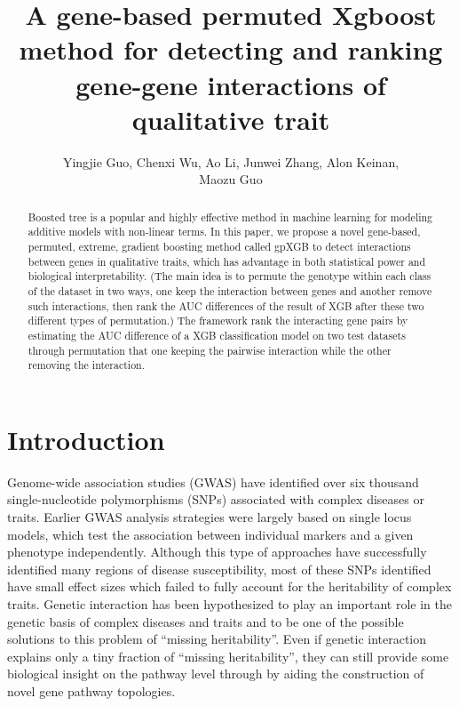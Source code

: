 \documentclass[11pt]{article}
\author{Yingjie Guo, Chenxi Wu, Ao Li, Junwei Zhang, Alon Keinan,\\ Maozu Guo}
\title{A gene-based permuted Xgboost method for detecting and ranking gene-gene interactions of qualitative trait}
\theoremstyle{plain}
\theoremstyle{definition}
\theoremstyle{remark}
\begin{document}
 
\maketitle
\begin{abstract}
Boosted tree is a popular and highly effective method in machine learning for modeling additive models with non-linear terms. In this paper, we propose a novel gene-based, permuted, extreme, gradient boosting method called gpXGB to detect interactions between genes in qualitative traits, which has advantage in both statistical power and biological interpretability. (The main idea is to permute the genotype within each class of the dataset in two ways, one keep the interaction between genes and another remove such interactions, then rank the AUC differences of the result of XGB after these two different types of permutation.) The framework rank the interacting gene pairs by estimating the AUC difference of a XGB classification model on two test datasets through permutation that one keeping the pairwise interaction while the other removing the interaction.

\end{abstract}

\section{Introduction}

Genome-wide association studies (GWAS) have identified over six thousand single-nucleotide polymorphisms (SNPs) associated with complex diseases or traits. Earlier GWAS analysis strategies were largely based on single locus models, which test the association between individual markers and a given phenotype independently. Although this type of approaches have successfully identified many regions of disease susceptibility, most of these SNPs identified have small effect sizes which failed to fully account for the heritability of complex traits. Genetic interaction has been hypothesized to play an important role in the genetic basis of complex diseases and traits and to be one of the possible solutions to this problem of ``missing heritability''. Even if genetic interaction explains only a tiny fraction of ``missing heritability'', they can still provide some biological insight on the pathway level through by aiding the construction of novel gene pathway topologies.\\
\end{document}
